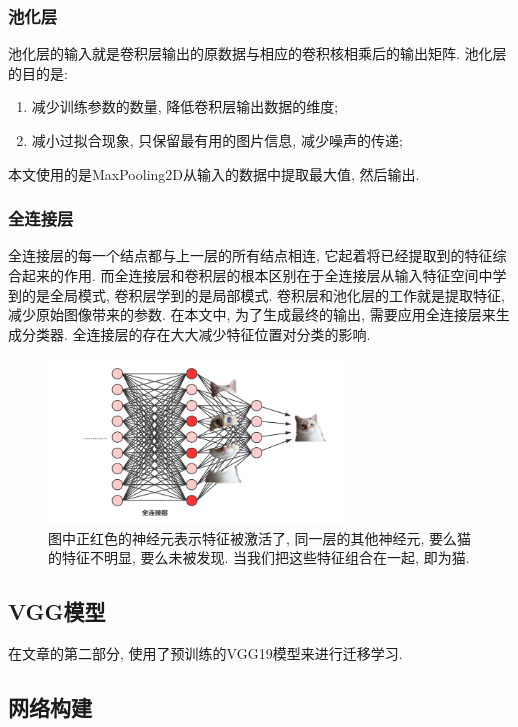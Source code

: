 \documentclass[lang=cn,11pt]{elegantpaper}
\begin{document}
\subsubsection*{池化层}
池化层的输入就是卷积层输出的原数据与相应的卷积核相乘后的输出矩阵. 池化层的目的是: 
\begin{enumerate}
	\item 减少训练参数的数量, 降低卷积层输出数据的维度; 
	\item 减小过拟合现象, 只保留最有用的图片信息, 减少噪声的传递; 
\end{enumerate}

本文使用的是MaxPooling2D从输入的数据中提取最大值, 然后输出. 
\subsubsection*{全连接层}
全连接层的每一个结点都与上一层的所有结点相连, 它起着将已经提取到的特征综合起来的作用. 而全连接层和卷积层的根本区别在于全连接层从输入特征空间中学到的是全局模式, 卷积层学到的是局部模式. 卷积层和池化层的工作就是提取特征, 减少原始图像带来的参数. 在本文中, 为了生成最终的输出, 需要应用全连接层来生成分类器. 全连接层的存在大大减少特征位置对分类的影响. 
\begin{figure}[hbtp]
\centering
  \includegraphics[width=0.7\textwidth]{densecat.png}
  \tiny
  \caption{图中正红色的神经元表示特征被激活了, 同一层的其他神经元, 要么猫的特征不明显, 要么未被发现. 当我们把这些特征组合在一起, 即为猫. \label{fig:densecat1}}
\end{figure}
\normalsize
\subsection{VGG模型}
在文章的第二部分, 使用了预训练的VGG19模型来进行迁移学习. 


\subsection{网络构建}
\end{document}

